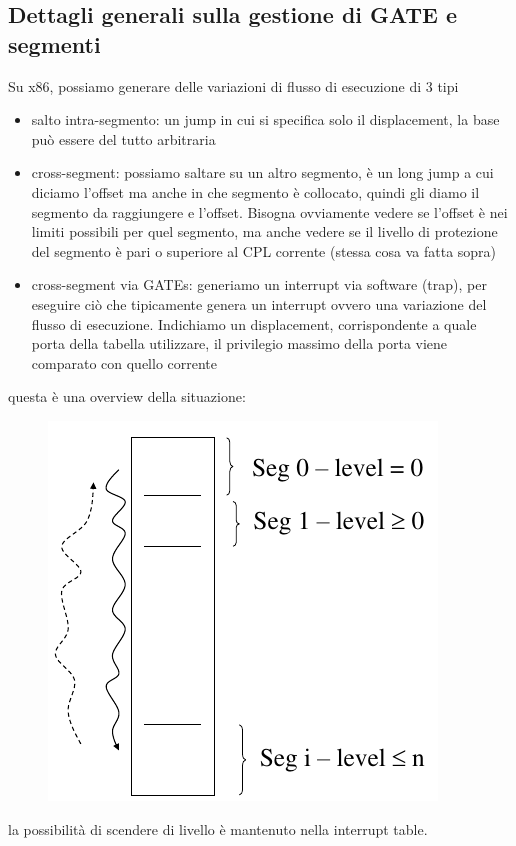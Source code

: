 \documentclass[12pt, oneside]{extbook}
\begin{document}
\subsection{Dettagli generali sulla gestione di GATE e segmenti}
Su x86, possiamo generare delle variazioni di flusso di esecuzione di 3 tipi
\begin{itemize}
\item salto intra-segmento: un jump  in cui si specifica solo il displacement, la base può essere del tutto arbitraria
\item cross-segment: possiamo saltare su un altro segmento, è un long jump a cui diciamo l'offset ma anche in che segmento è collocato, quindi gli diamo il segmento da raggiungere e l'offset. Bisogna ovviamente vedere se l'offset è nei limiti possibili per quel segmento, ma anche vedere se il livello di protezione del segmento è pari o superiore al CPL corrente (stessa cosa va fatta sopra)
\item cross-segment via GATEs: generiamo un interrupt via software (trap), per eseguire ciò che tipicamente genera un interrupt ovvero una variazione del flusso di esecuzione. Indichiamo un displacement, corrispondente a quale porta della tabella utilizzare, il privilegio massimo della porta viene comparato con quello corrente
\end{itemize}
questa è una overview della situazione:
\begin{figure}[!h]
	\includegraphics[scale=0.4]{immagini/jumps_overview.png}
\end{figure}
la possibilità di scendere di livello è mantenuto nella interrupt table.
\end{document}

